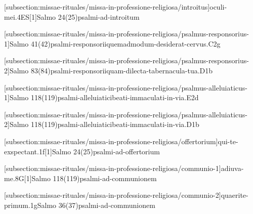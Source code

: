 \def\Prefix{subsection:missae-rituales/missa-in-professione-religiosa}

[\Prefix/introitus]{oculi-mei.4ES}[1]{Salmo 24(25)}{psalmi-ad-introitum}

[\Prefix/psalmus-responsorius-1]{Salmo 41(42)}{psalmi-responsorii}{quemadmodum-desiderat-cervus.C2g}

\AllowPageFlush

[\Prefix/psalmus-responsorius-2]{Salmo 83(84)}{psalmi-responsorii}{quam-dilecta-tabernacula-tua.D1b}

\AllowPageFlush

[\Prefix/psalmus-alleluiaticus-1]{Salmo 118(119)}{psalmi-alleluiatici}{beati-immaculati-in-via.E2d}

\AllowPageFlush

[\Prefix/psalmus-alleluiaticus-2]{Salmo 118(119)}{psalmi-alleluiatici}{beati-immaculati-in-via.D1b}

\AllowPageFlush

[\Prefix/offertorium]{qui-te-exspectant.1f}[1]{Salmo 24(25)}{psalmi-ad-offertorium}

\AllowPageFlush

[\Prefix/communio-1]{adiuva-me.8G}[1]{Salmo 118(119)}{psalmi-ad-communionem}

\AllowPageBreak

[\Prefix/communio-2]{quaerite-primum.1g}{Salmo 36(37)}{psalmi-ad-communionem}